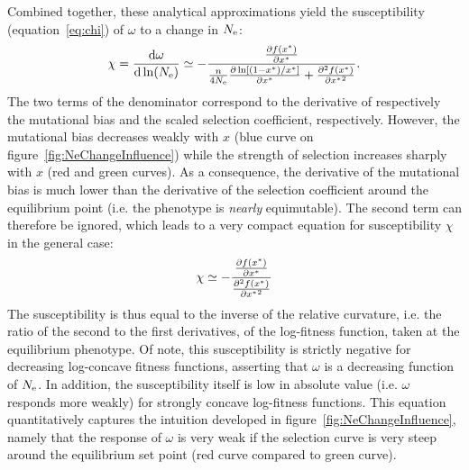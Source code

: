 Combined together, these analytical approximations yield the susceptibility (equation~\ref{eq:chi}) of $\omega$ to a change in $N_{\text{e}}$:
\begin{gather}
    \chi = \frac{ \text{d} \omega}{\text{d} \ln (N_{\text{e}})} \simeq - \frac{\frac{ \partial f (x^{*}) }{\partial {x^{*}}}}{\frac{n}{4 N_{\text{e}}} \frac{\partial \ln [ (1 - x^{*}) / x^{*} ]}{\partial x^{*} } + \frac{ \partial^2 f (x^{*}) }{\partial {x^{*}}^2}}.
\end{gather}
The two terms of the denominator correspond to the derivative of respectively the mutational bias and the scaled selection coefficient, respectively.
However, the mutational bias decreases weakly with $x$ (blue curve on figure~\ref{fig:NeChangeInfluence}) while the strength of selection increases sharply with $x$ (red and green curves).
As a consequence, the derivative of the mutational bias is much lower than the derivative of the selection coefficient around the equilibrium point (i.e. the phenotype is \textit{nearly} equimutable).
The second term can therefore be ignored, which leads to a very compact equation for susceptibility $\chi$ in the general case:
\begin{gather}
    \chi \simeq - \frac{\frac{ \partial f (x^{*}) }{\partial {x^{*}}}}{\frac{ \partial^2 f (x^{*}) }{\partial {x^{*}}^2}}
\end{gather}
The susceptibility is thus equal to the inverse of the relative curvature, i.e. the ratio of the second to the first derivatives, of the log-fitness function, taken at the equilibrium phenotype.
Of note, this susceptibility is strictly negative for decreasing log-concave fitness functions, asserting that $\omega$ is a decreasing function of $N_{\text{e}}$.
In addition, the susceptibility itself is low in absolute value (i.e. $\omega$ responds more weakly) for strongly concave log-fitness functions.
This equation quantitatively captures the intuition developed in figure~\ref{fig:NeChangeInfluence}, namely that the response of $\omega$ is very weak if the selection curve is very steep around the equilibrium set point (red curve compared to green curve).


